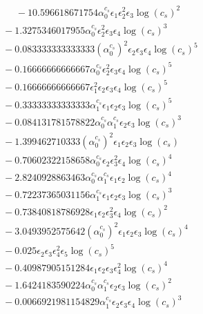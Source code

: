 \documentclass[10pt]{article}
\begin{document}
\begin{align*}
\phantom{F_{s,5}} &\phantom{={}}{}  - 10.596618671754 \alpha_{0}^{c_s} \epsilon_{1} \epsilon_{2}^{2} \epsilon_{3} \log{\left(c_{s} \right)}^{2} \\
&{}  - 1.3275346017955 \alpha_{0}^{c_s} \epsilon_{2}^{2} \epsilon_{3} \epsilon_{4} \log{\left(c_{s} \right)}^{3} \\
&{}  - 0.083333333333333 \left(\alpha_{0}^{c_s}\right)^{2} \epsilon_{2} \epsilon_{3} \epsilon_{4} \log{\left(c_{s} \right)}^{5} \\
&{}  - 0.16666666666667 \alpha_{0}^{c_s} \epsilon_{2}^{2} \epsilon_{3} \epsilon_{4} \log{\left(c_{s} \right)}^{5} \\
&{}  - 0.16666666666667 \epsilon_{1}^{2} \epsilon_{2} \epsilon_{3} \epsilon_{4} \log{\left(c_{s} \right)}^{5} \\
&{}  - 0.33333333333333 \alpha_{1}^{c_s} \epsilon_{1} \epsilon_{2} \epsilon_{3} \log{\left(c_{s} \right)}^{5} \\
&{}  - 0.084131781578822 \alpha_{0}^{c_s} \alpha_{1}^{c_s} \epsilon_{2} \epsilon_{3} \log{\left(c_{s} \right)}^{3} \\
&{}  - 1.399462710333 \left(\alpha_{0}^{c_s}\right)^{2} \epsilon_{1} \epsilon_{2} \epsilon_{3} \log{\left(c_{s} \right)} \\
&{}  - 0.70602322158658 \alpha_{0}^{c_s} \epsilon_{2} \epsilon_{3}^{2} \epsilon_{4} \log{\left(c_{s} \right)}^{4} \\
&{}  - 2.8240928863463 \alpha_{0}^{c_s} \alpha_{1}^{c_s} \epsilon_{1} \epsilon_{2} \log{\left(c_{s} \right)}^{4} \\
&{}  - 0.72237365031156 \alpha_{1}^{c_s} \epsilon_{1} \epsilon_{2} \epsilon_{3} \log{\left(c_{s} \right)}^{3} \\
&{}  - 0.73840818786928 \epsilon_{1} \epsilon_{2} \epsilon_{3}^{2} \epsilon_{4} \log{\left(c_{s} \right)}^{2} \\
&{}  - 3.0493952575642 \left(\alpha_{0}^{c_s}\right)^{2} \epsilon_{1} \epsilon_{2} \epsilon_{3} \log{\left(c_{s} \right)}^{4} \\
&{}  - 0.025 \epsilon_{2} \epsilon_{3} \epsilon_{4}^{2} \epsilon_{5} \log{\left(c_{s} \right)}^{5} \\
&{}  - 0.40987905151284 \epsilon_{1} \epsilon_{2} \epsilon_{3} \epsilon_{4}^{2} \log{\left(c_{s} \right)}^{4} \\
&{}  - 1.6424183590224 \alpha_{0}^{c_s} \alpha_{1}^{c_s} \epsilon_{2} \epsilon_{3} \log{\left(c_{s} \right)}^{2} \\
&{}  - 0.0066921981154829 \alpha_{1}^{c_s} \epsilon_{2} \epsilon_{3} \epsilon_{4} \log{\left(c_{s} \right)}^{3} \\

\end{align*}
\end{document}
